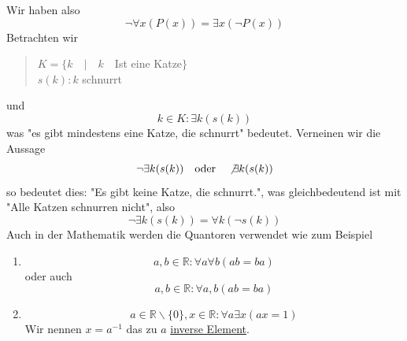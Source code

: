 \documentclass{report}
\begin{document}
Wir haben also
\begin{equation}\lnot \forall x (P(x)) = \exists x ( \lnot P(x))\end{equation}
Betrachten wir
\begin{quote}$K = \{k\quad|\quad k \quad  $Ist eine Katze$\}$\\
$s(k) : k$ schnurrt\end{quote}
und
\begin{equation}k \in K : \exists k (s(k))\end{equation}
was "es gibt mindestens eine Katze, die schnurrt" bedeutet. Verneinen wir die Aussage
\begin{equation}\lnot \exists k (s(k)) \quad \mbox{oder} \quad \not \exists k (s(k))\end{equation}
so bedeutet dies: "Es gibt keine Katze, die schnurrt.", was gleichbedeutend ist mit "Alle Katzen schnurren nicht", also
\begin{equation}\lnot \exists k (s(k)) = \forall k (\lnot s(k))\end{equation}
Auch in der Mathematik werden die Quantoren verwendet wie zum Beispiel
\begin{enumerate}
\item \begin{equation}a,b \in \mathbb{R} : \forall a \forall b (ab = ba)\end{equation}
oder auch\begin{equation}a,b \in \mathbb{R} : \forall a,b (ab = ba)\end{equation}
\item \begin{equation}a \in \mathbb{R} \backslash \{0\}, x \in \mathbb{R}: \forall a \exists x (ax=1)\end{equation} Wir nennen $x=a^{-1}$ das zu $a$ \underline{inverse Element}.
\end{enumerate}
\end{document}
